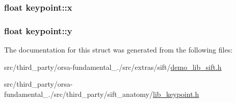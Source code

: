 \subsubsection[{x}]{\setlength{\rightskip}{0pt plus 5cm}float keypoint\+::x}\label{structkeypoint_a139d95b51c24bc6c30bf36a726867454}
\hypertarget{structkeypoint_a8e27752a285c5360e01a6d9964870c51}{}
\subsubsection[{y}]{\setlength{\rightskip}{0pt plus 5cm}float keypoint\+::y}\label{structkeypoint_a8e27752a285c5360e01a6d9964870c51}


The documentation for this struct was generated from the following files\+:\begin{DoxyCompactItemize}
\item 
src/third\+\_\+party/orsa-\/fundamental\+\_./src/extras/sift/\hyperlink{demo__lib__sift_8h}{demo\+\_\+lib\+\_\+sift.\+h}\item 
src/third\+\_\+party/orsa-\/fundamental\+\_./src/third\+\_\+party/sift\+\_\+anatomy/\hyperlink{lib__keypoint_8h}{lib\+\_\+keypoint.\+h}\end{DoxyCompactItemize}
